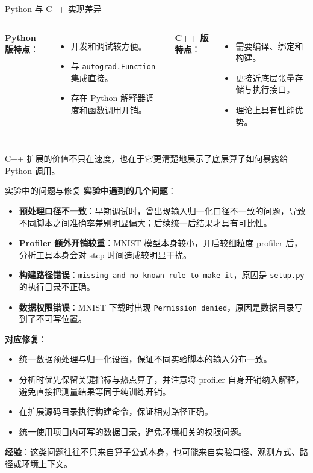 \documentclass[10pt, aspectratio=169]{beamer}
\begin{document}
\begin{frame}{Python 与 C++ 实现差异}
    \begin{columns}[T,totalwidth=\textwidth]
        \textbf{Python 版特点}：
        \begin{itemize}
            \item 开发和调试较方便。
            \item 与 \texttt{autograd.Function} 集成直接。
            \item 存在 Python 解释器调度和函数调用开销。
        \end{itemize}

        \textbf{C++ 版特点}：
        \begin{itemize}
            \item 需要编译、绑定和构建。
            \item 更接近底层张量存储与执行接口。
            \item 理论上具有性能优势。
        \end{itemize}
    \end{columns}

    \vspace{0.2cm}
    C++ 扩展的价值不只在速度，也在于它更清楚地展示了底层算子如何暴露给 Python 调用。
\end{frame}

\begin{frame}{实验中的问题与修复}
    \textbf{实验中遇到的几个问题}：
    \begin{itemize}
        \item \textbf{预处理口径不一致}：早期调试时，曾出现输入归一化口径不一致的问题，导致不同脚本之间准确率差别明显偏大；后续统一后结果才具有可比性。
        \item \textbf{Profiler 额外开销较重}：MNIST 模型本身较小，开启较细粒度 profiler 后，分析工具本身会对 step 时间造成较明显干扰。
        \item \textbf{构建路径错误}：\texttt{missing and no known rule to make it}，原因是 \texttt{setup.py} 的执行目录不正确。
        \item \textbf{数据权限错误}：MNIST 下载时出现 \texttt{Permission denied}，原因是数据目录写到了不可写位置。
    \end{itemize}

    \vspace{0.2cm}
    \textbf{对应修复}：
    \begin{itemize}
        \item 统一数据预处理与归一化设置，保证不同实验脚本的输入分布一致。
        \item 分析时优先保留关键指标与热点算子，并注意将 profiler 自身开销纳入解释，避免直接把测量结果等同于纯训练开销。
        \item 在扩展源码目录执行构建命令，保证相对路径正确。
        \item 统一使用项目内可写的数据目录，避免环境相关的权限问题。
    \end{itemize}

    \vspace{0.2cm}
    \textbf{经验}：这类问题往往不只来自算子公式本身，也可能来自实验口径、观测方式、路径或环境上下文。
\end{frame}
\end{document}
